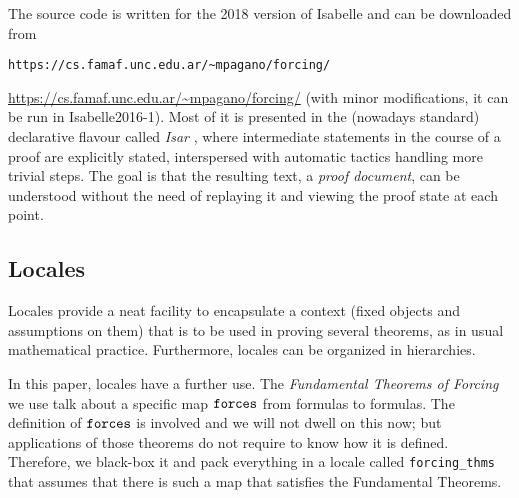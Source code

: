 The source code is written for the 2018 version of Isabelle and can be downloaded
from 
\ifIEEE
\begin{center}
\texttt{https://cs.famaf.unc.edu.ar/\~{}mpagano/forcing/}
\end{center}
\fi
\ifarXiv
\url{https://cs.famaf.unc.edu.ar/~mpagano/forcing/}
\fi
(with
minor modifications, it can be run in Isabelle2016-1). Most of it is
presented in the (nowadays standard) declarative flavour called
\emph{Isar} \cite{DBLP:conf/tphol/Wenzel99}, where intermediate
statements in the course of a proof are explicitly stated,
interspersed with automatic tactics handling more trivial steps. The
goal is that the resulting text, a \emph{proof document}, can be
understood without the need of replaying it and viewing the proof state
at each point.

\subsection{Locales}
\label{sec:locales}
Locales \cite{ballarin2010tutorial} provide a neat facility to
encapsulate a context (fixed objects and assumptions on them) that is
to be used in proving several theorems, as in usual mathematical
practice. Furthermore, locales can be organized in hierarchies. 

In this paper, locales have a further use. The \emph{Fundamental
  Theorems of Forcing} we use talk about a specific map $\mathop{\mathtt{forces}}$
from formulas to formulas. The definition of $\mathop{\mathtt{forces}}$ is involved
and we will not dwell on this now; but applications of those theorems
do not require to know how it is defined. Therefore, we black-box it
and pack everything in a locale called \texttt{forcing\_thms} that
assumes that there is such a 
map that satisfies the Fundamental Theorems.



